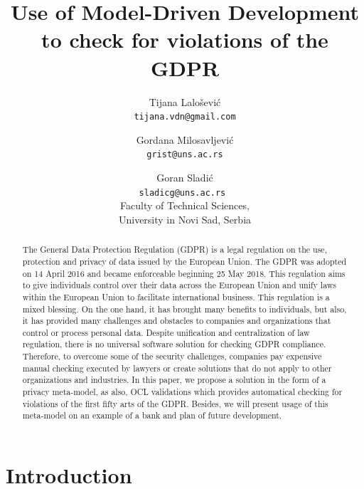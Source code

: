 \documentclass[11pt,english]{article}
\begin{document}
\title{Use of Model-Driven Development to check for violations of the GDPR}
\author{
  Tijana Lalošević\\
  \texttt{tijana.vdn@gmail.com}
  \and
  Gordana Milosavljević\\
  \texttt{grist@uns.ac.rs}
  \and
  Goran Sladić\\
  \texttt{sladicg@uns.ac.rs }
  \\Faculty of Technical Sciences,\\ University in Novi Sad, Serbia
}


\date{}
\maketitle


\begin{abstract}
The General Data Protection Regulation (GDPR) \cite{gdprRegulation} is a legal regulation on the use, protection and privacy of data issued by the European Union. The GDPR was adopted on 14 April 2016 and became enforceable beginning 25 May 2018. \cite{gdpr} This regulation aims to give individuals control over their data across the European Union and unify laws within the European Union to facilitate international business. This regulation is a mixed blessing. On the one hand, it has brought many benefits to individuals, but also, it has provided many challenges and obstacles to companies and organizations that control or process personal data. Despite unification and centralization of law regulation, there is no universal software solution for checking GDPR compliance. Therefore, to overcome some of the security challenges, companies pay expensive manual checking executed by lawyers or create solutions that do not apply to other organizations and industries. In this paper, we propose a solution in the form of a privacy meta-model, as also, OCL validations \cite{ocl} which provides automatical checking for violations of the first fifty arts of the GDPR. Besides, we will present usage of this meta-model on an example of a bank and plan of future development.
\end{abstract}

\section{Introduction}
\end{document}
